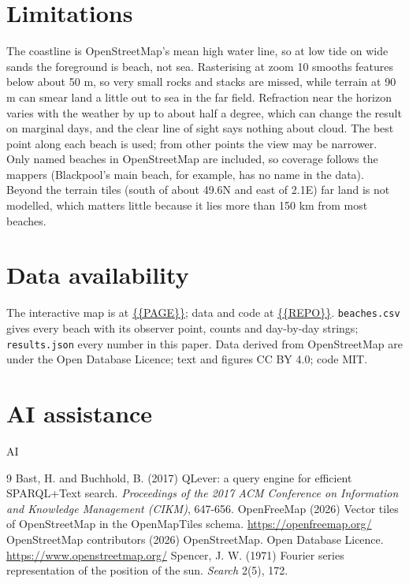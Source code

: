 \documentclass[11pt,a4paper]{article}
\begin{document}
\section{Limitations}
The coastline is OpenStreetMap's mean high water line, so at low tide on wide sands the foreground is beach, not sea. Rasterising at zoom 10 smooths features below about 50 m, so very small rocks and stacks are missed, while terrain at 90 m can smear land a little out to sea in the far field. Refraction near the horizon varies with the weather by up to about half a degree, which can change the result on marginal days, and the clear line of sight says nothing about cloud. The best point along each beach is used; from other points the view may be narrower. Only named beaches in OpenStreetMap are included, so coverage follows the mappers (Blackpool's main beach, for example, has no name in the data). Beyond the terrain tiles (south of about 49.6\textdegree N and east of 2.1\textdegree E) far land is not modelled, which matters little because it lies more than 150 km from most beaches.

\section{Data availability}
The interactive map is at \url{{{PAGE}}}; data and code at \url{{{REPO}}}. \texttt{beaches.csv} gives every beach with its observer point, counts and day-by-day strings; \texttt{results.json} every number in this paper. Data derived from OpenStreetMap are under the Open Database Licence; text and figures CC BY 4.0; code MIT.

\section*{AI assistance}
{{AI}}

\begin{thebibliography}{9}
 Bast, H. and Buchhold, B. (2017) QLever: a query engine for efficient SPARQL+Text search. \textit{Proceedings of the 2017 ACM Conference on Information and Knowledge Management (CIKM)}, 647-656.
 OpenFreeMap (2026) Vector tiles of OpenStreetMap in the OpenMapTiles schema. \url{https://openfreemap.org/}
 OpenStreetMap contributors (2026) OpenStreetMap. Open Database Licence. \url{https://www.openstreetmap.org/}
 Spencer, J. W. (1971) Fourier series representation of the position of the sun. \textit{Search} 2(5), 172.
\end{thebibliography}
\end{document}
